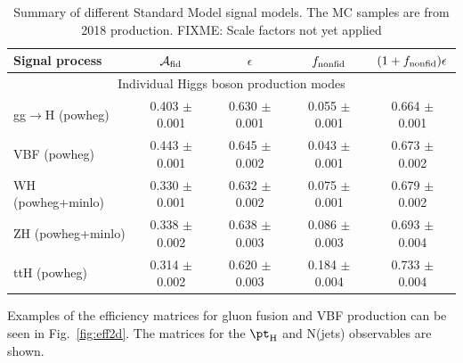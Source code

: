 \begin{table}[!h!tb]
	\begin{center}
		\small
		\caption{
			Summary of different Standard Model signal models. The MC samples are from 2018 production. {\color{red} FIXME: Scale factors not yet applied}
			\label{tab:summarySM}
		}
		\begin{tabular}{|l|c|c|c|c|} \hline \hline 
			\textbf{Signal process} & $\mathcal{A}_{\rm fid}$ & $\epsilon$ & $f_{\rm nonfid}$  & $(1+f_{\rm nonfid})\epsilon$ \\ \hline \hline 
			\multicolumn{5}{|c|}{Individual Higgs boson production modes} \\ \hline 
 gg$\rightarrow$H ({\sc powheg})  & 0.403 $\pm$ 0.001 & 0.630 $\pm$ 0.001 & 0.055 $\pm$ 0.001 & 0.664 $\pm$ 0.001 \\ 
 VBF ({\sc powheg})  & 0.443 $\pm$ 0.001 & 0.645 $\pm$ 0.002 & 0.043 $\pm$ 0.001 & 0.673 $\pm$ 0.002 \\ 
 WH ({\sc powheg+minlo})  & 0.330 $\pm$ 0.001 & 0.632 $\pm$ 0.002 & 0.075 $\pm$ 0.001 & 0.679 $\pm$ 0.002 \\ 
 ZH ({\sc powheg+minlo})  & 0.338 $\pm$ 0.002 & 0.638 $\pm$ 0.003 & 0.086 $\pm$ 0.003 & 0.693 $\pm$ 0.004 \\ 
 ttH ({\sc powheg})  & 0.314 $\pm$ 0.002 & 0.620 $\pm$ 0.003 & 0.184 $\pm$ 0.004 & 0.733 $\pm$ 0.004 \\
			\hline \hline
		\end{tabular}
		\normalsize
	\end{center}
\end{table}






Examples of the efficiency matrices for gluon fusion and VBF production can be seen in Fig.~\ref{fig:eff2d}. The matrices for the $\pt_{\rm H}$ and N(jets) observables are shown.

